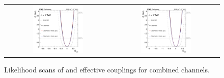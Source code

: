 \begin{figure}[ht]
  \begin{center}
    \begin{tabular}{cc}
      \includegraphics[width=0.49\textwidth]{figures/tW/fig/scan_all_plot/Cug_combined_scan.png}&
      \includegraphics[width=0.49\textwidth]{figures/tW/fig/scan_all_plot/Ccg_combined_scan.png}\\
    \end{tabular}
    \caption{Likelihood scans of \CuG and \CcG effective couplings for combined channels.
    \label{fig:FCNC_scan}}
  \end{center}
\end{figure}

